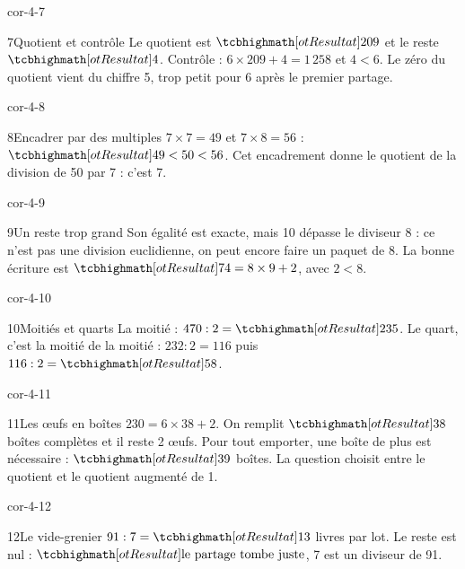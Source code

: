 \begin{blocLivre}{cor-4-7}\begin{corrige}{7}{Quotient et contrôle}
Le quotient est $\res{209}$ et le reste $\res4$. Contrôle : $6\times209+4=1\,258$ et $4<6$. Le zéro du quotient vient du chiffre 5, trop petit pour 6 après le premier partage.
\end{corrige}\end{blocLivre}
\begin{blocLivre}{cor-4-8}\begin{corrige}{8}{Encadrer par des multiples}
$7\times7=49$ et $7\times8=56$ : $\res{49<50<56}$. Cet encadrement donne le quotient de la division de 50 par 7 : c’est 7.
\end{corrige}\end{blocLivre}
\begin{blocLivre}{cor-4-9}\begin{corrige}{9}{Un reste trop grand}
Son égalité est exacte, mais 10 dépasse le diviseur 8 : ce n’est pas une division euclidienne, on peut encore faire un paquet de 8. La bonne écriture est $\res{74=8\times9+2}$, avec $2<8$.
\end{corrige}\end{blocLivre}
\begin{blocLivre}{cor-4-10}\begin{corrige}{10}{Moitiés et quarts}
La moitié : $470:2=\res{235}$. Le quart, c’est la moitié de la moitié : $232:2=116$ puis $116:2=\res{58}$.
\end{corrige}\end{blocLivre}
\begin{blocLivre}{cor-4-11}\begin{corrige}{11}{Les œufs en boîtes}
$230=6\times38+2$. On remplit $\res{38}$ boîtes complètes et il reste 2 œufs. Pour tout emporter, une boîte de plus est nécessaire : $\res{39}$ boîtes. La question choisit entre le quotient et le quotient augmenté de 1.
\end{corrige}\end{blocLivre}
\begin{blocLivre}{cor-4-12}\begin{corrige}{12}{Le vide-grenier}
$91:7=\res{13}$ livres par lot. Le reste est nul : $\res{\text{le partage tombe juste}}$, 7 est un diviseur de 91.
\end{corrige}\end{blocLivre}
